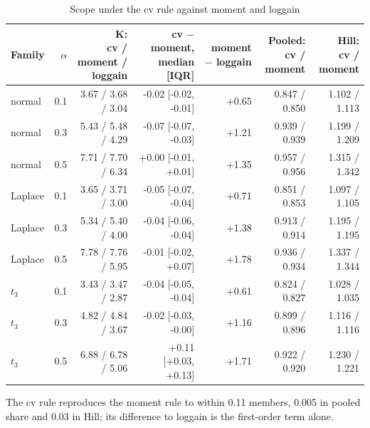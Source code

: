\begin{table}
\centering
\caption{Scope under the cv rule against moment and loggain}
\label{tab:a7c_cv_behaviour}
\small
\begin{tabular}{lrrrrrr}
\toprule
Family & $\alpha$ & \makecell[b]{K:\\{}cv / moment / loggain} & \makecell[b]{cv $-$ moment,\\{}median [IQR]} & \makecell[b]{moment $-$\\{}loggain} & \makecell[b]{Pooled:\\{}cv / moment} & \makecell[b]{Hill:\\{}cv / moment} \\
\midrule
normal & 0.1 & 3.67 / 3.68 / 3.04 & -0.02 [-0.02, -0.01] & +0.65 & 0.847 / 0.850 & 1.102 / 1.113 \\
normal & 0.3 & 5.43 / 5.48 / 4.29 & -0.07 [-0.07, -0.03] & +1.21 & 0.939 / 0.939 & 1.199 / 1.209 \\
normal & 0.5 & 7.71 / 7.70 / 6.34 & +0.00 [-0.01, +0.01] & +1.35 & 0.957 / 0.956 & 1.315 / 1.342 \\
Laplace & 0.1 & 3.65 / 3.71 / 3.00 & -0.05 [-0.07, -0.04] & +0.71 & 0.851 / 0.853 & 1.097 / 1.105 \\
Laplace & 0.3 & 5.34 / 5.40 / 4.00 & -0.04 [-0.06, -0.04] & +1.38 & 0.913 / 0.914 & 1.195 / 1.195 \\
Laplace & 0.5 & 7.78 / 7.76 / 5.95 & -0.01 [-0.02, +0.07] & +1.78 & 0.936 / 0.934 & 1.337 / 1.344 \\
$t_3$ & 0.1 & 3.43 / 3.47 / 2.87 & -0.04 [-0.05, -0.04] & +0.61 & 0.824 / 0.827 & 1.028 / 1.035 \\
$t_3$ & 0.3 & 4.82 / 4.84 / 3.67 & -0.02 [-0.03, -0.00] & +1.16 & 0.899 / 0.896 & 1.116 / 1.116 \\
$t_3$ & 0.5 & 6.88 / 6.78 / 5.06 & +0.11 [+0.03, +0.13] & +1.71 & 0.922 / 0.920 & 1.230 / 1.221 \\
\bottomrule
\end{tabular}
\par\smallskip\begin{minipage}{0.95\linewidth}\footnotesize The cv rule reproduces the moment rule to within 0.11 members, 0.005 in pooled share and 0.03 in Hill; its difference to loggain is the first-order term alone.\end{minipage}
\end{table}
